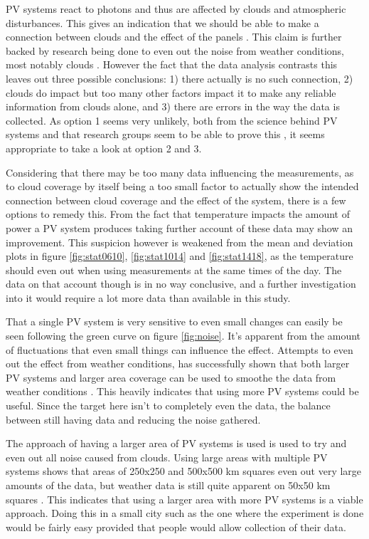 PV systems react to photons and thus are affected by clouds
and atmospheric disturbances.  This gives an indication that we should be able to make
a connection between clouds and the effect of the panels
\citep{photovoltaic}.  This claim is further backed by research being
done to even out the noise from weather conditions, most notably
clouds \citep{southafrica, cloudTrack}.  However the fact that the
data analysis contrasts this leaves out three possible conclusions: 1)
there actually is no such connection, 2) clouds do impact but too many
other factors impact it to make any reliable information from clouds
alone, and 3) there are errors in the way the data is collected.  As
option 1 seems very unlikely, both from the science behind PV systems
and that research groups seem to be able to prove this
\citep{southafrica, cloudTrack, photovoltaic}, it seems appropriate to
take a look at option 2 and 3.

Considering that there may be too many data influencing the
measurements, as to cloud coverage by itself being a too small factor
to actually show the intended connection between cloud coverage and
the effect of the system, there is a few options to remedy this.  From
the fact that temperature impacts the amount of power a PV system
produces \citep{mppt2004} taking further account of these data may
show an improvement.  This suspicion however is weakened from the mean
and deviation plots in figure \ref{fig:stat0610}, \ref{fig:stat1014}
and \ref{fig:stat1418}, as the temperature should even out when using
measurements at the same times of the day.  The data on that account
though is in no way conclusive, and a further investigation into it
would require a lot more data than available in this study.

That a single PV system is very sensitive to even small changes can
easily be seen following the green curve on figure \ref{fig:noise}.
It's apparent from the amount of fluctuations that even small things
can influence the effect.  Attempts to even out the effect from
weather conditions, has successfully shown that both larger PV systems
and larger area coverage can be used to smoothe the data from weather
conditions \citep{cloudTrack,southafrica}.  This heavily indicates
that using more PV systems could be useful.  Since the target here
isn't to completely even the data, the balance between still having
data and reducing the noise gathered.

The approach of having a larger area of PV systems is used is used to
try and even out all noise caused from clouds.  Using large areas with
multiple PV systems shows that areas of 250x250 and 500x500 km squares
even out very large amounts of the data, but weather data is still
quite apparent on 50x50 km squares \citep{southafrica}.  This
indicates that using a larger area with more PV systems is a viable
approach.  Doing this in a small city such as the one where the
experiment is done would be fairly easy provided that people would
allow collection of their data.

